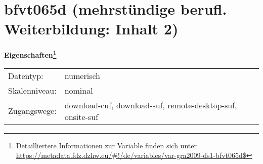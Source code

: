 
    \setcounter{footnote}{0}

    \vspace*{-1.8cm}
	\section{bfvt065d (mehrstündige berufl. Weiterbildung: Inhalt 2)}
	\label{section:bfvt065d}



    \vspace*{0.5cm}
    \noindent\textbf{Eigenschaften\footnote{Detailliertere Informationen zur Variable finden sich unter
		\url{https://metadata.fdz.dzhw.eu/\#!/de/variables/var-gra2009-ds1-bfvt065d$}}}\\
	\begin{tabularx}{\hsize}{@{}lX}
	Datentyp: & numerisch \\
	Skalenniveau: & nominal \\
	Zugangswege: &
	  download-cuf, 
	  download-suf, 
	  remote-desktop-suf, 
	  onsite-suf
 \\
    \end{tabularx}



